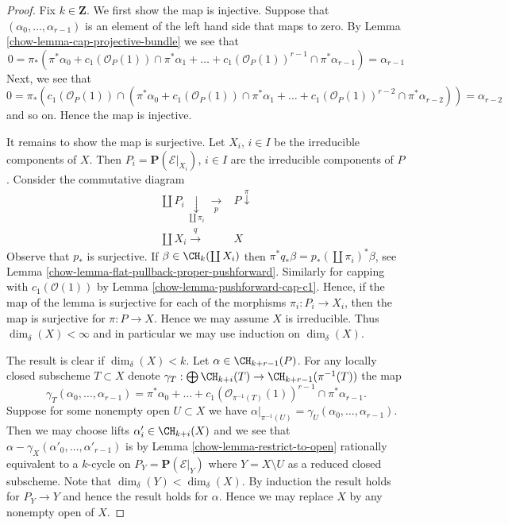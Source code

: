 \begin{proof}

Fix $k \in \mathbf{Z}$. We first show the map is injective.
Suppose that $(\alpha_0, \ldots, \alpha_{r - 1})$ is an element
of the left hand side that maps to zero.
By Lemma \ref{chow-lemma-cap-projective-bundle} we see that
$$
0 = \pi_*(\pi^*\alpha_0 +
c_1(\mathcal{O}_P(1)) \cap \pi^*\alpha_1
+ \ldots +
c_1(\mathcal{O}_P(1))^{r - 1} \cap \pi^*\alpha_{r-1})
= \alpha_{r - 1}
$$
Next, we see that
$$
0 = \pi_*(c_1(\mathcal{O}_P(1)) \cap (\pi^*\alpha_0 +
c_1(\mathcal{O}_P(1)) \cap \pi^*\alpha_1
+ \ldots +
c_1(\mathcal{O}_P(1))^{r - 2} \cap \pi^*\alpha_{r - 2}))
= \alpha_{r - 2}
$$
and so on. Hence the map is injective.

\medskip\noindent
It remains to show the map is surjective.
Let $X_i$, $i \in I$ be the irreducible components of $X$.
Then $P_i = \mathbf{P}(\mathcal{E}|_{X_i})$, $i \in I$
are the irreducible components of $P$. Consider the commutative
diagram
$$
\begin{array}{cc}\coprod P_i \underset{\coprod \pi_i}{\downarrow}\underset{p}{\longrightarrow} & P \overset{\pi}{\downarrow} \\ \coprod X_i \overset{q}{\longrightarrow} & X\end{array}
$$
Observe that $p_*$ is surjective. If $\beta \in \CH_k(\coprod X_i)$
then $\pi^* q_* \beta = p_*(\coprod \pi_i)^* \beta$, see
Lemma \ref{chow-lemma-flat-pullback-proper-pushforward}. Similarly for
capping with $c_1(\mathcal{O}(1))$ by
Lemma \ref{chow-lemma-pushforward-cap-c1}.
Hence, if the map of the lemma is surjective for each
of the morphisms $\pi_i : P_i \to X_i$, then the map is
surjective for $\pi : P \to X$. Hence we may assume $X$ is irreducible.
Thus $\dim_\delta(X) < \infty$ and in particular we may use
induction on $\dim_\delta(X)$.

\medskip\noindent
The result is clear if $\dim_\delta(X) < k$.
Let $\alpha \in \CH_{k + r - 1}(P)$.
For any locally closed subscheme $T \subset X$ denote
$\gamma_T : \bigoplus \CH_{k + i}(T) \to \CH_{k + r - 1}(\pi^{-1}(T))$
the map
$$
\gamma_T(\alpha_0, \ldots, \alpha_{r - 1})
= \pi^*\alpha_0 + \ldots +
c_1(\mathcal{O}_{\pi^{-1}(T)}(1))^{r - 1} \cap \pi^*\alpha_{r - 1}.
$$
Suppose for some nonempty open $U \subset X$ we have
$\alpha|_{\pi^{-1}(U)} = \gamma_U(\alpha_0, \ldots, \alpha_{r - 1})$.
Then we may choose lifts $\alpha'_i \in \CH_{k + i}(X)$ and we
see that $\alpha - \gamma_X(\alpha'_0, \ldots, \alpha'_{r - 1})$
is by Lemma \ref{chow-lemma-restrict-to-open}
rationally equivalent to a $k$-cycle on $P_Y = \mathbf{P}(\mathcal{E}|_Y)$
where $Y = X \setminus U$ as a reduced closed subscheme.
Note that $\dim_\delta(Y) < \dim_\delta(X)$.
By induction the result holds
for $P_Y \to Y$ and hence the result holds for $\alpha$.
Hence we may replace $X$ by any nonempty open of $X$.


\end{proof}
